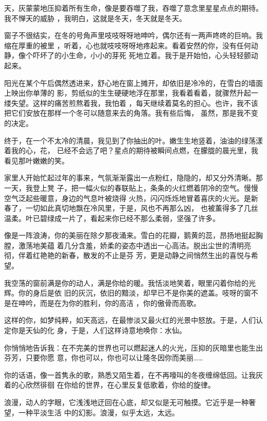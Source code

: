 \documentclass[12pt,a4paper]{article}
\begin{document}
		天，灰蒙蒙地压抑着所有生命，像是要吞噬了我，吞噬了意念里星星点点的期待。我不惮天的威胁
	，我明白，这就是冬天，冬天就是冬天。

		窗子不很结实，在冬的号角声里吱吱呀呀地呻吟，偶尔还有一两声咚咚的巨响。我缩在厚重的被里
	，听着，心也就吱吱呀呀地疼起来。看着安然的你，没有任何动静，像个吓坏了的小生命，小小的芽死
	死地立着。我于是开始怕，心头轻轻颤动起来。

		阳光在某个午后偶然透进来，舒心地在窗上摊开，却依旧是冷冷的，在雪白的墙面上映出你单薄的
	影，剪纸似的生生硬硬地浮在那里，我看着看着，就骤然升起一缕失望。这样的痛苦煎熬着我，我怕着
	，每天继续着莫名的担心。也许，我不该把它们安放在那样一个冬可以随意来去的角落。我有些后悔，
	虽然，那是我不变的决定。

		终于，在一个不太冷的清晨，我见到了你抽出的叶。嫩生生地竖着，油油的绿荡漾着我的心，花，
	已经不会远了吧？星点的期待被瞬间点燃，在朦胧的晨光里，我看见那叶嫩嫩的笑。

		家里人开始忙起过年的事来，气氛渐渐露出一点粉红，隐隐的，却又分外清晰。那一天，我登上凳
	子，把一幅火似的春联贴上，条条的火红燃着阴冷的空气。慢慢空气泛起些暖意，身边的气息叶被烧得
	火热，闪闪烁烁地冒着喜庆的火光。是新春了，一切如此真切地飘在冷风里，于是，风也不再那么凶，
	也被薰得多了几丝温柔。叶已碧绿成一片了，看起来你已经不那么柔弱，坚强了许多。

		像是一阵浪涛，你的美丽在除夕那夜涌来。雪白的花瓣，鹅黄的蕊，昂扬地挺起胸膛，激荡地美蕴
	着几分含羞，娇柔的姿态中透出一心高洁。脱出尘世的清明亮彻，伴着红艳艳的新春，散发的不止是芬
	芳，更是动静之间悄然生出的喜悦与希望。

		我空荡的窗前满是你的动人，满是你给的暖。我恬淡地笑着，眼里闪着你给的光辉。你的身后是依
	旧的灰沉，依旧的黯淡，却早已不是你美的遮盖。吱呀的窗不是在呻吟，而是在为你的胜利，你的高洁
	，你的傲骨而高歌。

		这样的你，如梦纯粹，如天高远，在最惨淡又最火红的光景中怒放。于是，人们认定你是天仙的化
	身，于是，人们这样诗意地唤你：水仙。

		你悄悄地告诉我：在不完美的世界也可以燃起迷人的火光，压抑的灰暗里也能生出芬芳，只要你愿
	意，你也可以，你也可以让隆冬因你而美丽……

		你的话语，像一首隽永的歌，熟悉又陌生着，在不再嚎叫的冬夜缠绵低回。让我灰着的心欣然徘徊
	在你给的世界，在心里反复低歌着，你给的旋律。

	\endwriting



		浪漫，动人的字眼，它浅浅地迂回在心底，却又似是无可触摸。它近乎是一种奢望，一种平淡生活
	中的幻影。浪漫，似乎太远，太远。
\end{document}
